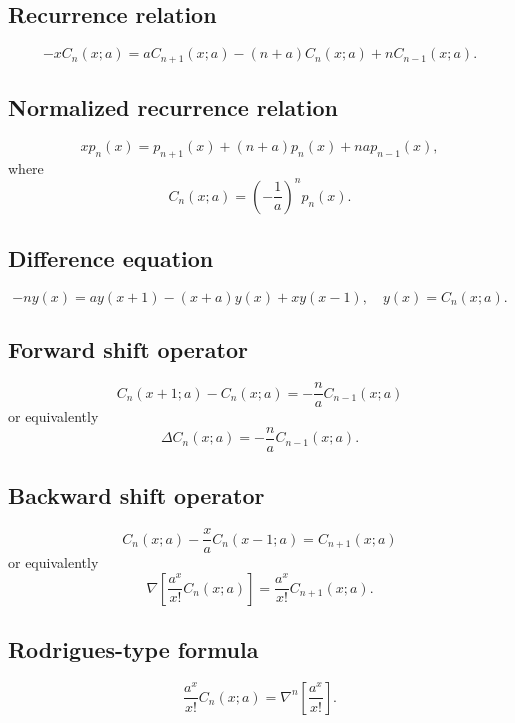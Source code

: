 \documentclass[envcountchap,graybox]{svmono}
\begin{document}
\subsection*{Recurrence relation}
\begin{equation}
\label{RecCharlier}
-xC_n(x;a)=aC_{n+1}(x;a)-(n+a)C_n(x;a)+nC_{n-1}(x;a).
\end{equation}

\subsection*{Normalized recurrence relation}
\begin{equation}
\label{NormRecCharlier}
xp_n(x)=p_{n+1}(x)+(n+a)p_n(x)+nap_{n-1}(x),
\end{equation}
where
$$C_n(x;a)=\left(-\frac{1}{a}\right)^np_n(x).$$

\subsection*{Difference equation}
\begin{equation}
\label{dvCharlier}
-ny(x)=ay(x+1)-(x+a)y(x)+xy(x-1),\quad y(x)=C_n(x;a).
\end{equation}

\subsection*{Forward shift operator}
\begin{equation}
\label{shift1CharlierI}
C_n(x+1;a)-C_n(x;a)=-\frac{n}{a}C_{n-1}(x;a)
\end{equation}
or equivalently
\begin{equation}
\label{shift1CharlierII}
\Delta C_n(x;a)=-\frac{n}{a}C_{n-1}(x;a).
\end{equation}

\subsection*{Backward shift operator}
\begin{equation}
\label{shift2CharlierI}
C_n(x;a)-\frac{x}{a}C_n(x-1;a)=C_{n+1}(x;a)
\end{equation}
or equivalently
\begin{equation}
\label{shift2CharlierII}
\nabla\left[\frac{a^x}{x!}C_n(x;a)\right]=\frac{a^x}{x!}C_{n+1}(x;a).
\end{equation}

\subsection*{Rodrigues-type formula}
\begin{equation}
\label{RodCharlier}
\frac{a^x}{x!}C_n(x;a)=\nabla^n\left[\frac{a^x}{x!}\right].
\end{equation}
\end{document}
